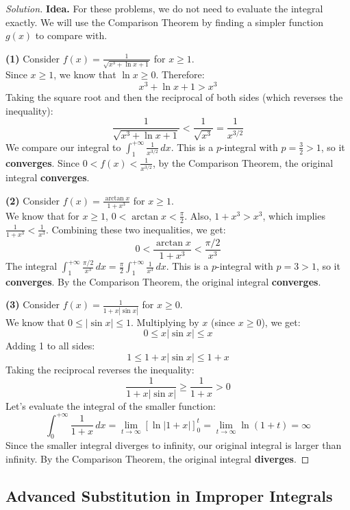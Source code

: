 \documentclass[11pt]{article}
\theoremstyle{definition}
\newenvironment{solution}{\begin{proof}[Solution]}{\end{proof}}
\begin{document}
\begin{solution}
\textbf{Idea.} For these problems, we do not need to evaluate the integral exactly. We will use the Comparison Theorem by finding a simpler function $g(x)$ to compare with.

\textbf{(1)} Consider $f(x) = \frac{1}{\sqrt{x^3+\ln x+1}}$ for $x \ge 1$. \\
Since $x \ge 1$, we know that $\ln x \ge 0$. Therefore:
\[
x^3 + \ln x + 1 > x^3
\]
Taking the square root and then the reciprocal of both sides (which reverses the inequality):
\[
\frac{1}{\sqrt{x^3+\ln x+1}} < \frac{1}{\sqrt{x^3}} = \frac{1}{x^{3/2}}
\]
We compare our integral to $\int_1^{+\infty} \frac{1}{x^{3/2}} \,dx$. This is a $p$-integral with $p = \frac{3}{2} > 1$, so it \textbf{converges}. 
Since $0 < f(x) < \frac{1}{x^{3/2}}$, by the Comparison Theorem, the original integral \textbf{converges}.

\textbf{(2)} Consider $f(x) = \frac{\arctan x}{1+x^3}$ for $x \ge 1$. \\
We know that for $x \ge 1$, $0 < \arctan x < \frac{\pi}{2}$. Also, $1 + x^3 > x^3$, which implies $\frac{1}{1+x^3} < \frac{1}{x^3}$.
Combining these two inequalities, we get:
\[
0 < \frac{\arctan x}{1+x^3} < \frac{\pi/2}{x^3}
\]
The integral $\int_1^{+\infty} \frac{\pi/2}{x^3} \,dx = \frac{\pi}{2} \int_1^{+\infty} \frac{1}{x^3} \,dx$. This is a $p$-integral with $p = 3 > 1$, so it \textbf{converges}. 
By the Comparison Theorem, the original integral \textbf{converges}.

\textbf{(3)} Consider $f(x) = \frac{1}{1+x\left|\sin x\right|}$ for $x \ge 0$. \\
We know that $0 \le |\sin x| \le 1$. Multiplying by $x$ (since $x \ge 0$), we get:
\[
0 \le x|\sin x| \le x
\]
Adding 1 to all sides:
\[
1 \le 1 + x|\sin x| \le 1 + x
\]
Taking the reciprocal reverses the inequality:
\[
\frac{1}{1+x|\sin x|} \ge \frac{1}{1+x} > 0
\]
Let's evaluate the integral of the smaller function:
\[
\int_0^{+\infty} \frac{1}{1+x} \,dx = \lim_{t \to \infty} \left[ \ln|1+x| \right]_0^t = \lim_{t \to \infty} \ln(1+t) = \infty
\]
Since the smaller integral diverges to infinity, our original integral is larger than infinity. By the Comparison Theorem, the original integral \textbf{diverges}.
\end{solution}

\subsection{Advanced Substitution in Improper Integrals}
\end{document}
